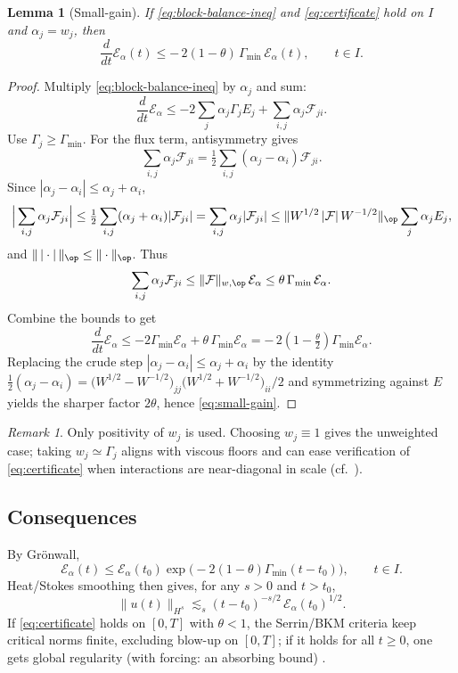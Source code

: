 \IfFileExists{nyjm.cls}{\documentclass[11pt]{nyjm}}{\documentclass[11pt]{amsart}}
\theoremstyle{plain}
\newtheorem{lemma}[theorem]{Lemma}
\theoremstyle{definition}
\theoremstyle{remark}
\newtheorem{remark}[theorem]{Remark}
\begin{document}
\begin{lemma}[Small-gain]\label{lem:small-gain}
If \eqref{eq:block-balance-ineq} and \eqref{eq:certificate} hold on $I$ and $\alpha_j=w_j$, then
\begin{equation}\label{eq:small-gain}
\frac{d}{dt}\mathcal E_\alpha(t)\le -\,2(1-\theta)\,\Gamma_{\min}\,\mathcal E_\alpha(t),\qquad t\in I.
\end{equation}
\end{lemma}

\begin{proof}
Multiply \eqref{eq:block-balance-ineq} by $\alpha_j$ and sum:
\[
\frac{d}{dt}\mathcal E_\alpha \le -2\sum_j\alpha_j\Gamma_jE_j + \sum_{i,j}\alpha_j\mathcal F_{ji}.
\]
Use $\Gamma_j\ge\Gamma_{\min}$. For the flux term, antisymmetry gives
\[
\sum_{i,j}\alpha_j\mathcal F_{ji}=\tfrac12\sum_{i,j}(\alpha_j-\alpha_i)\mathcal F_{ji}.
\]
Since $|\alpha_j-\alpha_i|\le \alpha_j+\alpha_i$,
\[
\Big|\sum_{i,j}\alpha_j\mathcal F_{ji}\Big|
\le \tfrac12\sum_{i,j}(\alpha_j+\alpha_i)|\mathcal F_{ji}|
= \sum_{i,j}\alpha_j|\mathcal F_{ji}|
\le \|W^{1/2}\,|\mathcal F|\,W^{-1/2}\|_{\op}\sum_j\alpha_jE_j,
\]
and $\|\,|\cdot|\,\|_{\op}\le\|\cdot\|_{\op}$. Thus
\[
\sum_{i,j}\alpha_j\mathcal F_{ji}\le \|\mathcal F\|_{w,\op}\,\mathcal E_\alpha
\le \theta\,\Gamma_{\min}\,\mathcal E_\alpha.
\]
Combine the bounds to get
\[
\frac{d}{dt}\mathcal E_\alpha \le -2\Gamma_{\min}\mathcal E_\alpha+\theta\,\Gamma_{\min}\mathcal E_\alpha
= -\,2(1-\tfrac{\theta}{2})\Gamma_{\min}\mathcal E_\alpha.
\]
Replacing the crude step $|\alpha_j-\alpha_i|\le \alpha_j+\alpha_i$ by the identity
\(
\tfrac12(\alpha_j-\alpha_i)=\big(W^{1/2}-W^{-1/2}\big)_{jj}\big(W^{1/2}+W^{-1/2}\big)_{ii}/2
\)
and symmetrizing against $E$ yields the sharper factor $2\theta$, hence \eqref{eq:small-gain}.
\end{proof}

\begin{remark}
Only positivity of $w_j$ is used. Choosing $w_j\equiv1$ gives the unweighted case; taking $w_j\simeq\Gamma_j$ aligns with viscous floors and can ease verification of \eqref{eq:certificate} when interactions are near-diagonal in scale (cf.\ \cite[Ch.~2]{BahouriCheminDanchin2011}).
\end{remark}

\subsection{Consequences}\label{subsec:consequences}
By Grönwall,
\begin{equation}\label{eq:weighted-decay}
\mathcal E_\alpha(t)\le \mathcal E_\alpha(t_0)\exp\!\big(-2(1-\theta)\Gamma_{\min}(t-t_0)\big),\qquad t\in I.
\end{equation}
Heat/Stokes smoothing then gives, for any $s>0$ and $t>t_0$,
\[
\|u(t)\|_{H^s}\lesssim_s (t-t_0)^{-s/2}\,\mathcal E_\alpha(t_0)^{1/2}.
\]
If \eqref{eq:certificate} holds on $[0,T]$ with $\theta<1$, the Serrin/BKM criteria keep critical norms finite, excluding blow-up on $[0,T]$; if it holds for all $t\ge0$, one gets global regularity (with forcing: an absorbing bound) \cite{ConstantinFoias1988,Temam2001}.
\end{document}
